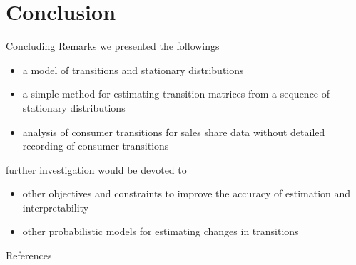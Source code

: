 \documentclass[fleqn,aspectratio=1610]{beamer}
\begin{document}
\section{Conclusion}
\label{sec:orgfa671d2}
\begin{frame}[label={sec:org2586ecd}]{Concluding Remarks}
we presented the followings

\begin{itemize}
\item a model of transitions and stationary distributions
\item a simple method for estimating transition matrices
from a sequence of stationary distributions
\item analysis of consumer transitions for sales share data
without detailed recording of consumer transitions
\end{itemize}

further investigation would be devoted to
\begin{itemize}
\item other objectives and constraints to improve the accuracy of
estimation and interpretability
\item other probabilistic models for estimating changes in
transitions
\end{itemize}
\end{frame}
\begin{frame}[allowframebreaks]{References}
\printbibliography[heading=none]
\end{frame}
\end{document}
